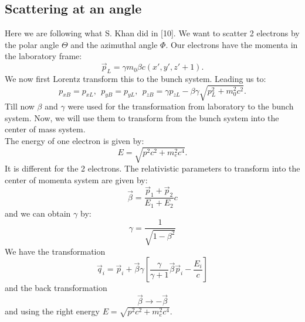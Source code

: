 \subsection{Scattering at an angle}
Here we are following what S. Khan did in [10]. We want to scatter 2 electrons by the polar angle $\Theta$ and the azimuthal angle $\Phi$. Our electrons have the momenta in the laboratory frame:
\begin{equation} \vec p_{L} = \gamma m_0 \beta c (x', y', z' + 1).\end{equation}
We now first Lorentz transform this to the bunch system. Leading us to:
\begin{equation} p_{xB} = p_{xL},\ \ p_{yB} = p_{yL},\ \ p_{zB} = \gamma p_{zL} - \beta \gamma \sqrt{p_L ^2 + m_0^2 c^2}.\end{equation}
Till now  $\beta$ and $\gamma$ were used for the transformation from laboratory to the bunch system. Now, we will use them to transform from the bunch system into the center of mass system.\\
The energy of one electron is given by:
\begin{equation} E = \sqrt{ p ^2 c^2 + m_e ^2 c^4}. \end{equation}
It is different for the 2 electrons. The relativistic parameters to transform into the center of momenta system are given by:
\begin{equation} \vec \beta = \frac{\vec p_1 + \vec p_2}{E_1 + E_2} c \end{equation}
and we can obtain $\gamma$ by:
\begin{equation} \gamma = \frac 1 {\sqrt{1 - \beta^2}} \end{equation}
We have the transformation
\begin{equation} \vec q_i = \vec p_i + \vec \beta \gamma \left[ \frac \gamma {\gamma + 1} \vec \beta \vec p_i - \frac{E_i}{c}\right] \end{equation}
and the back transformation
\begin{equation} \vec \beta \rightarrow - \vec \beta  \end{equation}
and using the right energy $E = \sqrt{ p^2 c^2 + m_e ^2 c^4}$.\\

